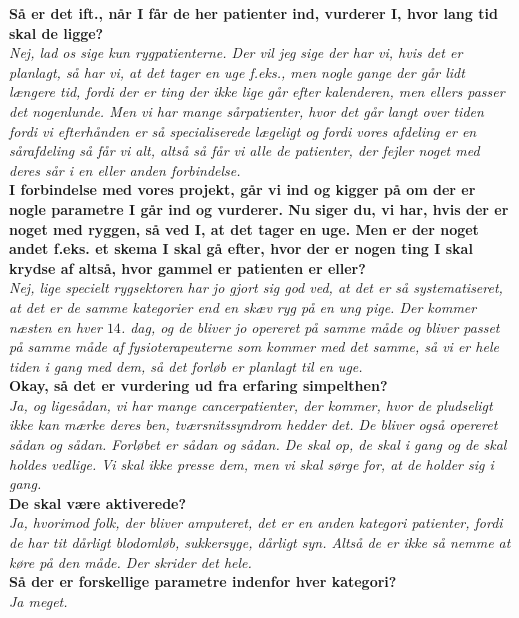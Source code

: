 \noindent
\textbf{Så er det ift., når I får de her patienter ind, vurderer I, hvor lang tid skal de ligge?}\\
\noindent
\textit{Nej, lad os sige kun rygpatienterne. Der vil jeg sige der har vi, hvis det er planlagt, så har vi, at det tager en uge f.eks., men nogle gange der går lidt længere tid, fordi der er ting der ikke lige går efter kalenderen, men ellers passer det nogenlunde. Men vi har mange sårpatienter, hvor det går langt over tiden fordi vi efterhånden er så specialiserede lægeligt og fordi vores afdeling er en sårafdeling så får vi alt, altså så får vi alle de patienter, der fejler noget med deres sår i en eller anden forbindelse.}\\
\noindent
\textbf{I forbindelse med vores projekt, går vi ind og kigger på om der er nogle parametre I går ind og vurderer. Nu siger du, vi har, hvis der er noget med ryggen, så ved I, at det tager en uge. Men er der noget andet f.eks. et skema I skal gå efter, hvor der er nogen ting I skal krydse af altså, hvor gammel er patienten er eller?}\\
\noindent
\textit{Nej, lige specielt rygsektoren har jo gjort sig god ved, at det er så systematiseret, at det er de samme kategorier end en skæv ryg på en ung pige. Der kommer næsten en hver $14$. dag, og de bliver jo opereret på samme måde og bliver passet på samme måde af fysioterapeuterne som kommer med det samme, så vi er hele tiden i gang med dem, så det forløb er planlagt til en uge.}\\
\noindent
\textbf{Okay, så det er vurdering ud fra erfaring simpelthen?}\\
\noindent
\textit{Ja, og ligesådan, vi har mange cancerpatienter, der kommer, hvor de pludseligt ikke kan mærke deres ben,  tværsnitssyndrom hedder det. De bliver også opereret sådan og sådan. Forløbet er sådan og sådan. De  skal op, de skal i gang og de skal holdes vedlige. Vi skal ikke presse dem, men vi skal sørge for, at de holder sig i gang.}\\
\noindent
\textbf{De skal være aktiverede?}\\
\noindent
\textit{Ja, hvorimod folk, der bliver amputeret, det er en anden kategori patienter, fordi de har tit dårligt blodomløb, sukkersyge, dårligt syn. Altså de er ikke så nemme at køre på den måde. Der skrider det hele.}\\
\noindent
\textbf{Så der er forskellige parametre indenfor hver kategori?}\\
\noindent
\textit{Ja meget.}\\
